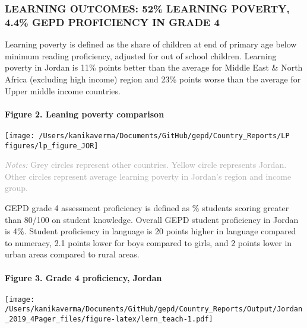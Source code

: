 \documentclass[twocolumn]{article}
\let\oldparagraph\paragraph
\renewcommand{\paragraph}[1]{\oldparagraph{#1}\mbox{}}
\begin{document}
\hypertarget{learning-outcomes-52-learning-poverty-4.4-gepd-proficiency-in-grade-4}{%
\subsubsection{\texorpdfstring{\textbf{LEARNING OUTCOMES: 52\% LEARNING
POVERTY, 4.4\% GEPD PROFICIENCY IN GRADE
4}}{LEARNING OUTCOMES: 52\% LEARNING POVERTY, 4.4\% GEPD PROFICIENCY IN GRADE 4}}\label{learning-outcomes-52-learning-poverty-4.4-gepd-proficiency-in-grade-4}}

Learning poverty is defined as the share of children at end of primary
age below minimum reading proficiency, adjusted for out of school
children. Learning poverty in Jordan is 11\% points better than the
average for Middle East \& North Africa (excluding high income) region
and 23\% points worse than the average for Upper middle income
countries.

\hypertarget{figure-2.-leaning-poverty-comparison}{%
\paragraph{Figure 2. Leaning poverty
comparison}\label{figure-2.-leaning-poverty-comparison}}

\texttt{[image: /Users/kanikaverma/Documents/GitHub/gepd/Country\_Reports/LP figures/lp\_figure\_JOR]}

{\scriptsize
    \textcolor{darkgray}{\textit{Notes:} Grey circles represent other countries. Yellow circle represents Jordan. Other circles represent average learning poverty in Jordan's region and income group.}
  }

GEPD grade 4 assessment proficiency is defined as \% students scoring
greater than 80/100 on student knowledge. Overall GEPD student
proficiency in Jordan is 4\%. Student proficiency in language is 20
points higher in language compared to numeracy, 2.1 points lower for
boys compared to girls, and 2 points lower in urban areas compared to
rural areas. \vfill\null

\hypertarget{figure-3.-grade-4-proficiency-jordan}{%
\paragraph{Figure 3. Grade 4 proficiency,
Jordan}\label{figure-3.-grade-4-proficiency-jordan}}

\texttt{[image: /Users/kanikaverma/Documents/GitHub/gepd/Country\_Reports/Output/Jordan\_2019\_4Pager\_files/figure-latex/lern\_teach-1.pdf]}
\end{document}
